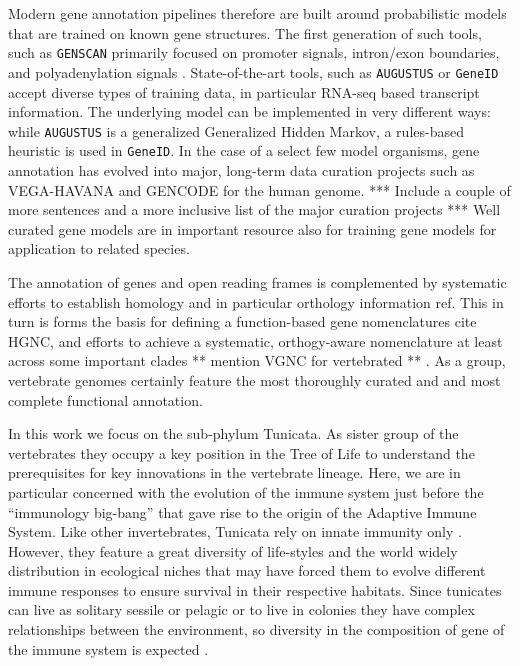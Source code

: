 \documentclass[11pt]{article}
\newcommand{\TODO}[1]{\begingroup\color{red}#1\endgroup}
\newcommand{\PFS}[1]{\begingroup\color{blue}#1\endgroup}
\begin{document}
  \PFS{Modern gene annotation pipelines therefore are built around
  probabilistic models that are trained on known gene structures. The first
  generation of such tools, such as \texttt{GENSCAN} \cite{genescan}
  primarily focused on promoter signals, intron/exon boundaries, and
  polyadenylation signals \cite{claverie}. State-of-the-art tools, such as
  \texttt{AUGUSTUS} \cite{augustus} or \texttt{GeneID} \cite{Blanco:2007}
  accept diverse types of training data, in particular RNA-seq based
  transcript information. The underlying model can be implemented in very
  different ways: while \texttt{AUGUSTUS} is a generalized Generalized
  Hidden Markov, a rules-based heuristic is used in \texttt{GeneID}. In the
  case of a select few model organisms, gene annotation has evolved into
  major, long-term data curation projects such as VEGA-HAVANA and GENCODE
  for the human genome. \TODO{*** Include a couple of more sentences and a
  more inclusive list of the major curation projects ***} Well curated
  gene models are in important resource also for training gene models for
  application to related species.}
  
  \PFS{The annotation of genes and open reading frames is complemented by
  systematic efforts to establish homology \-\- and in particular orthology
  \-\- information \TODO{ref}. This in turn is forms the basis for defining a
  function-based gene nomenclatures \TODO{cite HGNC}, and efforts to
  achieve a systematic, orthogy-aware nomenclature at least across some
  important clades \TODO{** mention VGNC for vertebrated **}
  \cite{aken2016ensembl, birney2004overview}. As a group, vertebrate
  genomes certainly feature the most thoroughly curated and and most
  complete functional annotation.}

In this work we focus on the sub-phylum Tunicata. As sister group of the
vertebrates they occupy a key position in the Tree of Life to understand
the prerequisites for key innovations in the vertebrate lineage. Here, we
are in particular concerned with the evolution of the immune system just
before the ``immunology big-bang'' \cite{bernstein1996} that gave rise to
the origin of the Adaptive Immune System. Like other invertebrates,
Tunicata rely on innate immunity only \cite{franchi2017}. However, they
feature a great diversity of life-styles and the world widely distribution
in ecological niches that may have forced them to evolve different immune
responses to ensure survival in their respective habitats. Since tunicates
can live as solitary sessile or pelagic or to live in colonies they have
complex relationships between the environment, so diversity in the
composition of gene of the immune system is expected
\cite{carroll2008evo,berna2014evolutionary}.
\end{document}
